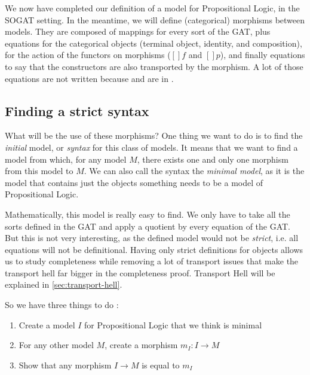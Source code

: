 \documentclass[10pt,a4paper]{article}
\begin{document}
			We now have completed our definition of a model for Propositional Logic, in the SOGAT setting. In the meantime, we will define (categorical) morphisms between models. They are composed of mappings for every sort of the GAT, plus equations for the categorical objects (terminal object, identity, and composition), for the action of the functors on morphisms ($[]f$ and $[]p$), and finally equations to say that the constructors are also transported by the morphism. A lot of those equations are not written because  and  are in \Prop{}.
			\begin{tcolorbox}
				\agdasep
			\end{tcolorbox}
		
		\subsection{Finding a strict syntax}
			
			What will be the use of these morphisms? One thing we want to do is to find the \emph{initial} model, or \emph{syntax} for this class of models. It means that we want to find a model from which, for any model $M$, there exists one and only one morphism from this model to $M$. We can also call the syntax the \emph{minimal model}, as it is the model that contains just the objects something needs to be a model of Propositional Logic.
			
			Mathematically, this model is really easy to find. We only have to take all the sorts defined in the GAT and apply a quotient by every equation of the GAT. But this is not very interesting, as the defined model would not be \emph{strict}, i.e. all equations will not be definitional. Having only strict definitions for objects allows us to study completeness while removing a lot of transport issues that make the transport hell far bigger in the completeness proof. Transport Hell will be explained in \autoref{sec:transport-hell}.
			
			So we have three things to do :
			\begin{enumerate}
				\setlength{\itemsep}{-1ex}
				\item Create a model $I$ for Propositional Logic that we think is minimal
				\item For any other model $M$, create a morphism $m_I : I \to M$
				\item Show that any morphism $I \to M$ is equal to $m_I$
			\end{enumerate}
		
\end{document}

